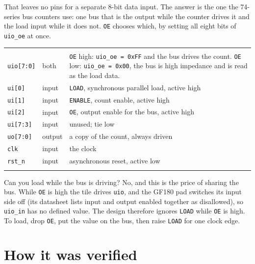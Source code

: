 \documentclass[11pt]{article}
\begin{document}
That leaves no pins for a separate 8-bit data input. The answer is the one the 74-series bus
counters use: one bus that is the output while the counter drives it and the load input while
it does not. \texttt{OE} chooses which, by setting all eight bits of \texttt{uio\_oe} at once.

\begin{hsblock}
\par\vspace{4pt}
\begin{tabularx}{\linewidth}{@{}L{62pt}L{58pt}Y@{}}
\hstoprule
{} &  &  \\
\hstoprule
\texttt{uio[7:0]} & both & \texttt{OE} high: \texttt{uio\_oe = 0xFF} and the bus drives the count. \texttt{OE} low: \texttt{uio\_oe = 0x00}, the bus is high impedance and is read as the load data. \\ \hline
\texttt{ui[0]} & input & \texttt{LOAD}, synchronous parallel load, active high \\ \hline
\texttt{ui[1]} & input & \texttt{ENABLE}, count enable, active high \\ \hline
\texttt{ui[2]} & input & \texttt{OE}, output enable for the bus, active high \\ \hline
\texttt{ui[7:3]} & input & unused; tie low \\ \hline
\texttt{uo[7:0]} & output & a copy of the count, always driven \\ \hline
\texttt{clk} & input & the clock \\ \hline
\texttt{rst\_n} & input & asynchronous reset, active low \\
\hstoprule
\end{tabularx}
\end{hsblock}

\begin{hscallout}{Can you load while the bus is driving?}
No, and this is the price of sharing the bus. While \texttt{OE} is high the tile drives
\texttt{uio}, and the GF180 pad switches its input side off (its datasheet lists input and output
enabled together as disallowed), so \texttt{uio\_in} has no defined value. The design therefore
ignores \texttt{LOAD} while \texttt{OE} is high. To load, drop \texttt{OE}, put the value on the
bus, then raise \texttt{LOAD} for one clock edge.
\end{hscallout}
\newpage

\section{How it was verified}\label{sec:verify}
\end{document}
